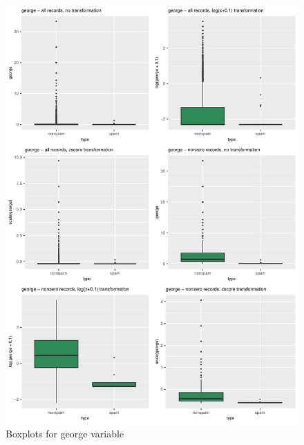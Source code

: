\documentclass{article}\usepackage[]{graphicx}\usepackage[]{xcolor}
\makeatletter
\def\maxwidth{ %
  \ifdim\Gin@nat@width>\linewidth
    \linewidth
  \else
    \Gin@nat@width
  \fi
}
\newenvironment{knitrout}{}{} %
\makeatother
\begin{document}
\begin{knitrout}
\color{fgcolor}\begin{figure}[h]
\includegraphics[width=\maxwidth]{figure/georgeBox-1} \caption[\label{fig2} Boxplots for george variable]{\label{fig2} Boxplots for george variable}\label{fig:georgeBox}
\end{figure}

\end{knitrout}
\end{document}
